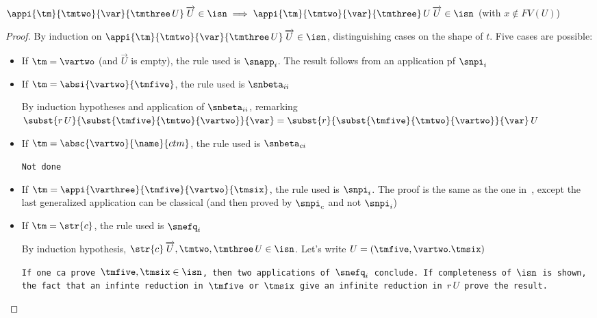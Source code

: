 \begin{lemma}\label{generalized_snpi_i}
  $\appi{\tm}{\tmtwo}{\var}{\tmthree\,U}\,\overrightarrow{U}\in\isn\implies\appi{\tm}{\tmtwo}{\var}{\tmthree}\,U\,\overrightarrow{U}\in\isn$ (with $x\notin FV(U)$)
\end{lemma}
\begin{proof}
  By induction on $\appi{\tm}{\tmtwo}{\var}{\tmthree\,U}\,\overrightarrow{U}\in\isn$, distinguishing cases on the shape of $t$. Five cases are possible:
  \begin{itemize}
  \item If $\tm=\vartwo$ (and $\overrightarrow{U}$ is empty), the rule used is $\snapp_i$. The result follows from an application pf $\snpi_i$
  \item If $\tm=\absi{\vartwo}{\tmfive}$, the rule used is $\snbeta_{ii}$

    By induction hypotheses and application of $\snbeta_{ii}$, remarking $\subst{r\,U}{\subst{\tmfive}{\tmtwo}{\vartwo}}{\var} = \subst{r}{\subst{\tmfive}{\tmtwo}{\vartwo}}{\var}\,U$
  \item If $\tm=\absc{\vartwo}{\name}{ctm}$, the rule used is $\snbeta_{ci}$

    \texttt{Not done}
  \item If $\tm=\appi{\varthree}{\tmfive}{\vartwo}{\tmsix}$, the rule used is $\snpi_i$. The proof is the same as the one in~\cite{LambdaJ}, except the last generalized application can be classical (and then proved by $\snpi_c$ and not $\snpi_i$)
  \item If $\tm=\str{c}$, the rule used is $\snefq_i$

    By induction hypothesis, $\str{c}\,\overrightarrow{U}, \tmtwo, \tmthree\,U\in\isn$. Let's write $U=(\tmfive, \vartwo.\tmsix)$

    \texttt{If one ca prove $\tmfive, \tmsix\in\isn$, then two applications of $\snefq_i$ conclude. If completeness of $\isn$ is shown, the fact that an infinte reduction in $\tmfive$ or $\tmsix$ give an infinite reduction in $r\,U$ prove the result.}
  \end{itemize}
\end{proof}

